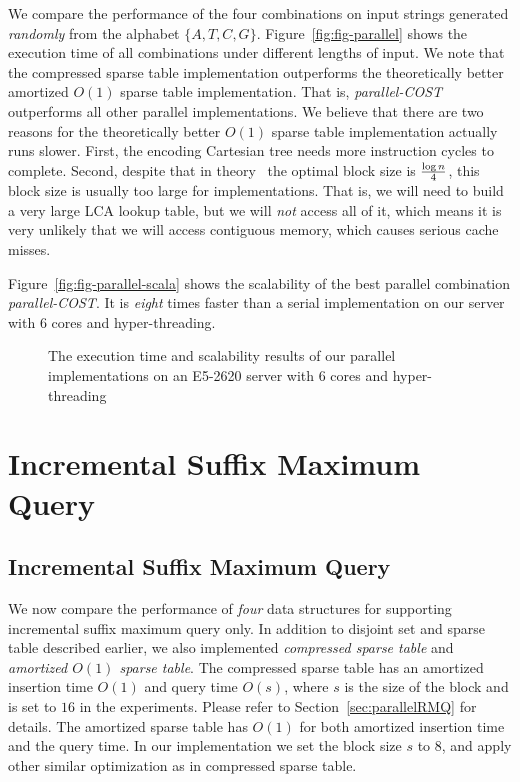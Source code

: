 We compare the performance of the four combinations on input strings
generated {\em randomly} from the alphabet $\{A, T, C, G\}$.
Figure~\ref{fig:fig-parallel} shows the execution time of all
combinations under different lengths of input.  We note that the
compressed sparse table implementation outperforms the theoretically
better amortized $O(1)$ sparse table implementation.  That is, {\em
parallel-COST} outperforms all other parallel implementations.  We
believe that there are two reasons for the theoretically better $O(1)$
sparse table implementation actually runs slower.  First, the encoding
Cartesian tree needs more instruction cycles to complete.  Second,
despite that in theory~\cite{Fischer2006TheoreticalAP} the optimal block
size is ${\log n}\over{4}$, this block size is usually too large for
implementations. That is, we will need to build a very large LCA lookup
table, but we will {\em not} access all of it, which means it is very
unlikely that we will access contiguous memory, which causes serious
cache misses.

Figure~\ref{fig:fig-parallel-scala} shows the scalability of the best
parallel combination {\em parallel-COST}.  It is {\em eight} times
faster than a serial implementation on our server with 6 cores and
hyper-threading.

\begin{figure}
  \centering
  \caption{The execution time and scalability results of our parallel
    implementations on an E5-2620 server with 6 cores and
    hyper-threading}
\end{figure}

\ifdefined\MasterThesis
\section{Incremental Suffix Maximum Query}
\else
\subsection{Incremental Suffix Maximum Query}
\fi

We now compare the performance of {\em four} data structures for
supporting incremental suffix maximum query only.  In addition to
disjoint set and sparse table described earlier, we also implemented
{\em compressed sparse table} and {\em amortized $O(1)$ sparse table}.
The compressed sparse table has an amortized insertion time $O(1)$ and
query time $O(s)$, where $s$ is the size of the block and is set to $16$
in the experiments.  Please refer to Section~\ref{sec:parallelRMQ} for
details.  The amortized sparse table has $O(1)$ for both amortized
insertion time and the query time.  In our implementation we set the
block size $s$ to $8$, and apply other similar optimization as in
compressed sparse table.

